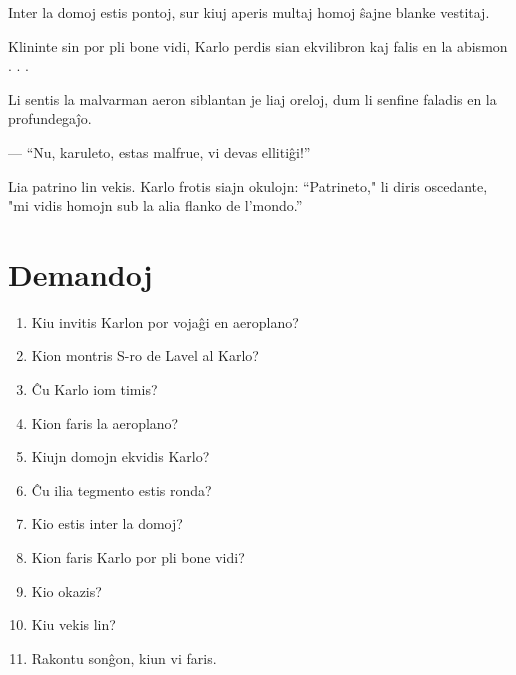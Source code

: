 Inter la domoj estis pontoj, sur kiuj aperis multaj homoj ŝajne blanke vestitaj.

Klininte sin por pli bone vidi, Karlo perdis sian ekvilibron kaj falis en la abismon . . .

Li sentis la malvarman aeron siblantan je liaj oreloj, dum li senfine faladis en la profundegaĵo.

— ``Nu, karuleto, estas malfrue, vi devas ellitiĝi!''

Lia patrino lin vekis. Karlo frotis siajn okulojn: ``Patrineto," li diris oscedante, "mi vidis homojn sub la alia flanko de l'mondo.''

\section*{Demandoj}

\begin{enumerate}
    \item  Kiu invitis Karlon por vojaĝi en aeroplano?
    \item  Kion montris S-ro de Lavel al Karlo?
    \item  Ĉu Karlo iom timis?
    \item  Kion faris la aeroplano?
    \item  Kiujn domojn ekvidis Karlo?
    \item  Ĉu ilia tegmento estis ronda?
    \item  Kio estis inter la domoj?
    \item  Kion faris Karlo por pli bone vidi?
    \item  Kio okazis?
    \item  Kiu vekis lin?
    \item  Rakontu sonĝon, kiun vi faris.
\end{enumerate}
